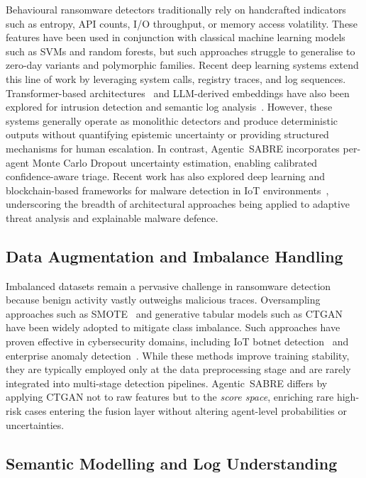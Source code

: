 \documentclass[3p]{elsarticle}
\begin{document}
Behavioural ransomware detectors traditionally rely on handcrafted indicators such as entropy, API counts, I/O throughput, or memory access volatility. These features have been used in conjunction with classical machine learning models such as SVMs and random forests, but such approaches struggle to generalise to zero-day variants and polymorphic families. Recent deep learning systems extend this line of work by leveraging system calls, registry traces, and log sequences. Transformer-based architectures~\cite{vaswani2017attention} and LLM-derived embeddings have also been explored for intrusion detection and semantic log analysis~\cite{tian2025llmsurvey, BenchmarkingLLMsPhishing2024,
CANAL_CTILLM2024}. However, these systems generally operate as monolithic
detectors and produce deterministic outputs without quantifying epistemic
uncertainty or providing structured mechanisms for human escalation. In contrast, Agentic~SABRE incorporates per-agent Monte Carlo Dropout uncertainty estimation, enabling calibrated confidence-aware triage. Recent work has also explored deep learning and blockchain-based frameworks for malware detection in IoT environments~\cite{pawar2024securing}, underscoring the breadth of architectural approaches being applied to adaptive threat analysis and explainable malware defence.

\subsection{Data Augmentation and Imbalance Handling}

Imbalanced datasets remain a pervasive challenge in ransomware detection because benign activity vastly outweighs malicious traces. Oversampling approaches such as SMOTE~\cite{chawla2002smote} and generative tabular models such as CTGAN ~\cite{xu2019ctgan, ashrapov2020tabular} have been widely adopted to mitigate class imbalance. Such approaches have proven effective in cybersecurity domains, including IoT botnet detection~\cite{HabibiCL23} and enterprise anomaly detection~\cite{AIenhancedDefense2022}. While these methods improve training
stability, they are typically employed only at the data preprocessing stage and are rarely integrated into multi-stage detection pipelines. Agentic~SABRE differs by applying CTGAN not to raw features but to the \emph{score space}, enriching rare high-risk cases entering the fusion layer without altering agent-level probabilities or uncertainties.

\subsection{Semantic Modelling and Log Understanding}
\end{document}
